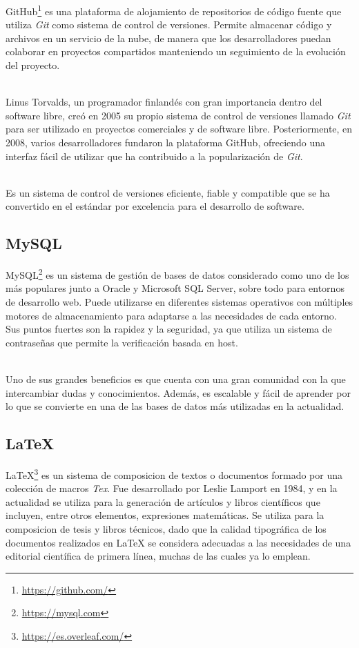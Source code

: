 \documentclass[a4paper, 12pt]{book}
\begin{document}
GitHub\footnote{\url{https://github.com/}} es una plataforma de alojamiento de repositorios de código fuente que utiliza \textit{Git} como sistema de control
de versiones. Permite almacenar código y archivos en un servicio de la nube, de manera que los desarrolladores puedan colaborar en proyectos compartidos
manteniendo un seguimiento de la evolución del proyecto.

\\Linus Torvalds, un programador finlandés con gran importancia dentro del software libre, creó en 2005 su propio sistema de control de versiones llamado \textit{Git} para ser utilizado
en proyectos comerciales y de software libre. Posteriormente, en 2008, varios desarrolladores fundaron la plataforma GitHub, ofreciendo una interfaz fácil de utilizar que ha contribuido a la
popularización de \textit{Git}.

\\Es un sistema de control de versiones eficiente, fiable y compatible que se ha convertido en el estándar por excelencia para el desarrollo de software.

\subsection{MySQL}
\label{subsec:mysql}

MySQL\footnote{\url{https://mysql.com}} es un sistema de gestión de bases de datos considerado como uno de los más populares junto a Oracle y Microsoft SQL Server, sobre todo para entornos de desarrollo web.
Puede utilizarse en diferentes sistemas operativos con múltiples motores de almacenamiento para adaptarse a las necesidades de cada entorno. Sus puntos fuertes son la rapidez y la seguridad, ya que utiliza un
sistema de contraseñas que permite la verificación basada en host.

\\Uno de sus grandes beneficios es que cuenta con una gran comunidad con la que intercambiar dudas y conocimientos. Además, es escalable y fácil de aprender por lo que se convierte en una de las bases de datos
más utilizadas en la actualidad.

\subsection{LaTeX}
\label{subsec:latex}

LaTeX\footnote{\url{https://es.overleaf.com/}} es un sistema de composicion de textos o documentos formado por una colección de macros \textit{Tex}. Fue desarrollado
por Leslie Lamport en 1984, y en la actualidad se utiliza para la generación de artículos y libros científicos que incluyen, entre otros elementos, expresiones matemáticas.
Se utiliza para la composicion de tesis y libros técnicos, dado que la calidad tipográfica de los documentos realizados en LaTeX se considera adecuadas a las necesidades de
una editorial científica de primera línea, muchas de las cuales ya lo emplean.
\end{document}

